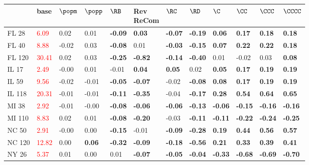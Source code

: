 \begin{tabular}{llllllllllll}
\toprule
 & base & $\popm$ & $\popp$ & $\RB$ & \makecell{Rev \\ ReCom} & $\RC$ & $\RD$ & $\C$ & $\CC$ & $\CCC$ & $\CCCC$ \\
\midrule
FL 28 & \textcolor{red}{ 6.09 } & 0.02 & 0.01 & \textbf{-0.09} & \textbf{0.03} & \textbf{-0.07} & \textbf{-0.19} & \textbf{0.06} & \textbf{0.17} & \textbf{0.18} & \textbf{0.18} \\
FL 40 & \textcolor{red}{ 8.88 } & -0.02 & 0.03 & \textbf{-0.08} & 0.01 & \textbf{-0.03} & \textbf{-0.15} & \textbf{0.07} & \textbf{0.22} & \textbf{0.22} & \textbf{0.18} \\
FL 120 & \textcolor{red}{ 30.41 } & 0.02 & 0.03 & \textbf{-0.25} & \textbf{-0.82} & \textbf{-0.14} & \textbf{-0.40} & 0.01 & -0.02 & 0.03 & \textbf{0.08} \\
IL 17 & \textcolor{red}{ 2.49 } & -0.00 & 0.01 & -0.01 & \textbf{0.04} & \textbf{0.05} & 0.02 & \textbf{0.05} & \textbf{0.17} & \textbf{0.19} & \textbf{0.19} \\
IL 59 & \textcolor{red}{ 9.56 } & -0.02 & -0.01 & \textbf{-0.05} & \textbf{-0.07} & -0.02 & \textbf{-0.08} & \textbf{0.08} & \textbf{0.17} & \textbf{0.19} & \textbf{0.19} \\
IL 118 & \textcolor{red}{ 20.31 } & -0.01 & -0.01 & \textbf{-0.11} & \textbf{-0.35} & -0.04 & \textbf{-0.17} & \textbf{0.28} & \textbf{0.54} & \textbf{0.64} & \textbf{0.65} \\
MI 38 & \textcolor{red}{ 2.92 } & -0.01 & -0.00 & \textbf{-0.08} & \textbf{-0.06} & \textbf{-0.06} & \textbf{-0.13} & \textbf{-0.06} & \textbf{-0.15} & \textbf{-0.16} & \textbf{-0.16} \\
MI 110 & \textcolor{red}{ 8.83 } & 0.02 & 0.01 & \textbf{-0.08} & \textbf{-0.20} & -0.03 & \textbf{-0.11} & \textbf{-0.11} & \textbf{-0.22} & \textbf{-0.24} & \textbf{-0.25} \\
NC 50 & \textcolor{red}{ 2.91 } & -0.00 & 0.00 & \textbf{-0.15} & -0.01 & \textbf{-0.09} & \textbf{-0.28} & \textbf{0.19} & \textbf{0.44} & \textbf{0.56} & \textbf{0.57} \\
NC 120 & \textcolor{red}{ 12.82 } & 0.00 & \textbf{0.06} & \textbf{-0.32} & \textbf{-0.09} & \textbf{-0.18} & \textbf{-0.56} & \textbf{0.21} & \textbf{0.33} & \textbf{0.39} & \textbf{0.41} \\
NY 26 & \textcolor{red}{ 5.37 } & 0.01 & 0.00 & 0.01 & \textbf{-0.07} & \textbf{-0.05} & \textbf{-0.04} & \textbf{-0.33} & \textbf{-0.68} & \textbf{-0.69} & \textbf{-0.70} \\

\end{tabular}
